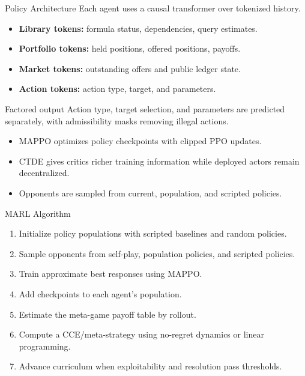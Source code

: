 \documentclass[10pt,aspectratio=169]{beamer}
\begin{document}
\begin{frame}{Policy Architecture}
\small
Each agent uses a causal transformer over tokenized history.

\begin{itemize}
  \item \textbf{Library tokens:} formula status, dependencies, query estimates.
  \item \textbf{Portfolio tokens:} held positions, offered positions, payoffs.
  \item \textbf{Market tokens:} outstanding offers and public ledger state.
  \item \textbf{Action tokens:} action type, target, and parameters.
\end{itemize}

\begin{block}{Factored output}
Action type, target selection, and parameters are predicted separately, with admissibility masks removing illegal actions.
\end{block}

\vspace{0.7em}
\begin{itemize}
  \item MAPPO optimizes policy checkpoints with clipped PPO updates.
  \item CTDE gives critics richer training information while deployed actors remain decentralized.
  \item Opponents are sampled from current, population, and scripted policies.
\end{itemize}
\end{frame}

\begin{frame}{MARL Algorithm}
\small
\begin{enumerate}
  \item Initialize policy populations with scripted baselines and random policies.
  \item Sample opponents from self-play, population policies, and scripted policies.
  \item Train approximate best responses using MAPPO.
  \item Add checkpoints to each agent's population.
  \item Estimate the meta-game payoff table by rollout.
  \item Compute a CCE/meta-strategy using no-regret dynamics or linear programming.
  \item Advance curriculum when exploitability and resolution pass thresholds.
\end{enumerate}
\end{frame}
\end{document}
